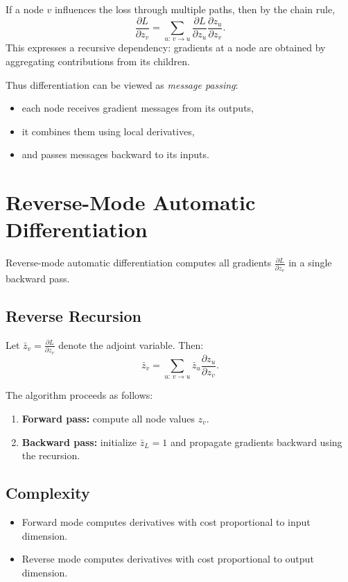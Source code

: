 If a node $v$ influences the loss through multiple paths, then by the chain rule,
\[
\frac{\partial L}{\partial z_v}
=
\sum_{u:\, v\to u}
\frac{\partial L}{\partial z_u}\frac{\partial z_u}{\partial z_v}.
\]
This expresses a recursive dependency: gradients at a node are obtained by aggregating contributions from its children.

Thus differentiation can be viewed as \emph{message passing}:
\begin{itemize}
    \item each node receives gradient messages from its outputs,
    \item it combines them using local derivatives,
    \item and passes messages backward to its inputs.
\end{itemize}

\section{Reverse-Mode Automatic Differentiation}

Reverse-mode automatic differentiation computes all gradients $\frac{\partial L}{\partial z_v}$ in a single backward pass.

\subsection{Reverse Recursion}

Let $\bar{z}_v = \frac{\partial L}{\partial z_v}$ denote the adjoint variable. Then:
\[
\bar{z}_v = \sum_{u:\, v\to u} \bar{z}_u \frac{\partial z_u}{\partial z_v}.
\]

The algorithm proceeds as follows:
\begin{enumerate}
    \item \textbf{Forward pass:} compute all node values $z_v$.
    \item \textbf{Backward pass:} initialize $\bar{z}_L = 1$ and propagate gradients backward using the recursion.
\end{enumerate}

\subsection{Complexity}

\begin{itemize}
    \item Forward mode computes derivatives with cost proportional to input dimension.
    \item Reverse mode computes derivatives with cost proportional to output dimension.
\end{itemize}

